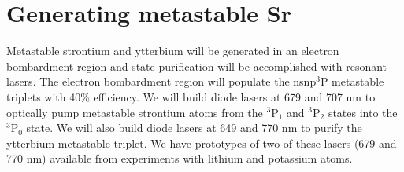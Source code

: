 \section{Generating metastable Sr}

Metastable strontium and ytterbium will be generated in an electron bombardment region \cite{Giu88} and state purification will be accomplished with resonant lasers. The electron bombardment region will populate the nsnp$^3$P metastable triplets with 40\% efficiency. We will build diode lasers at 679 and 707 nm to optically pump metastable strontium atoms from the $^3\textrm{P}_1$ and $^3\textrm{P}_2$ states into the $^3\textrm{P}_0$ state. We will also build diode lasers at 649 and 770 nm to purify the ytterbium metastable triplet. We have prototypes of two of these lasers (679 and 770 nm) available from experiments with lithium and potassium atoms.




